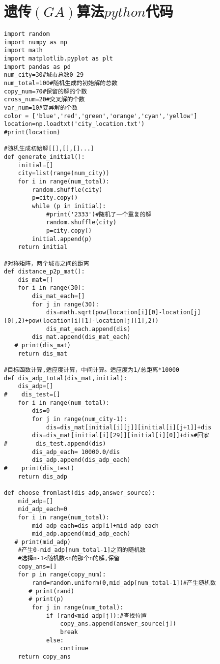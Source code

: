 \section{遗传$(GA)$算法$python$代码}
\begin{lstlisting}
import random
import numpy as np
import math
import matplotlib.pyplot as plt
import pandas as pd
num_city=30#城市总数0-29
num_total=100#随机生成的初始解的总数
copy_num=70#保留的解的个数
cross_num=20#交叉解的个数
var_num=10#变异解的个数
color = ['blue','red','green','orange','cyan','yellow']
location=np.loadtxt('city_location.txt')
#print(location)

#随机生成初始解[[],[],[]...]
def generate_initial():
    initial=[]
    city=list(range(num_city))
    for i in range(num_total):
        random.shuffle(city)
        p=city.copy()
        while (p in initial):
            #print('2333')#随机了一个重复的解
            random.shuffle(city)
            p=city.copy()
        initial.append(p)
    return initial

#对称矩阵，两个城市之间的距离
def distance_p2p_mat():
    dis_mat=[]
    for i in range(30):
        dis_mat_each=[]
        for j in range(30):
            dis=math.sqrt(pow(location[i][0]-location[j][0],2)+pow(location[i][1]-location[j][1],2))
            dis_mat_each.append(dis)
        dis_mat.append(dis_mat_each)
   # print(dis_mat)
    return dis_mat

#目标函数计算,适应度计算，中间计算。适应度为1/总距离*10000
def dis_adp_total(dis_mat,initial):
    dis_adp=[]
#    dis_test=[]   
    for i in range(num_total):
        dis=0
        for j in range(num_city-1):
            dis=dis_mat[initial[i][j]][initial[i][j+1]]+dis
        dis=dis_mat[initial[i][29]][initial[i][0]]+dis#回家
#        dis_test.append(dis)        
        dis_adp_each= 10000.0/dis
        dis_adp.append(dis_adp_each)
#    print(dis_test)
    return dis_adp

def choose_fromlast(dis_adp,answer_source):
    mid_adp=[]
    mid_adp_each=0
    for i in range(num_total):
        mid_adp_each=dis_adp[i]+mid_adp_each
        mid_adp.append(mid_adp_each)
   # print(mid_adp)
    #产生0-mid_adp[num_total-1]之间的随机数
    #选择n-1<随机数<n的那个n的解,保留
    copy_ans=[]
    for p in range(copy_num):
        rand=random.uniform(0,mid_adp[num_total-1])#产生随机数
       # print(rand)
       # print(p)
        for j in range(num_total):
            if (rand<mid_adp[j]):#查找位置
                copy_ans.append(answer_source[j])
                break
            else:
                continue
    return copy_ans


\end{lstlisting}

